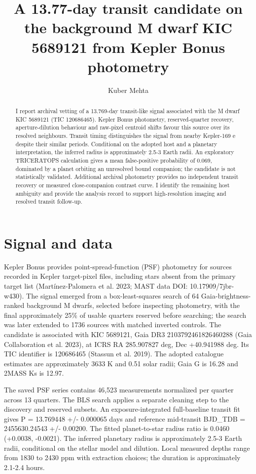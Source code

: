 \documentclass[twocolumn]{aastex7}
\begin{document}
\title{A 13.77-day transit candidate on the background M dwarf KIC 5689121 from Kepler Bonus photometry}
\author[0009-0003-1379-7856]{Kuber Mehta}
\begin{abstract}
I report archival vetting of a 13.769-day transit-like signal associated with the M dwarf KIC 5689121 (TIC 120686465). Kepler Bonus photometry, reserved-quarter recovery, aperture-dilution behaviour and raw-pixel centroid shifts favour this source over its resolved neighbours. Transit timing distinguishes the signal from nearby Kepler-169 e despite their similar periods. Conditional on the adopted host and a planetary interpretation, the inferred radius is approximately 2.5-3 Earth radii. An exploratory TRICERATOPS calculation gives a mean false-positive probability of 0.069, dominated by a planet orbiting an unresolved bound companion; the candidate is not statistically validated. Additional archival photometry provides no independent transit recovery or measured close-companion contrast curve. I identify the remaining host ambiguity and provide the analysis record to support high-resolution imaging and resolved transit follow-up.
\end{abstract}
\section{Signal and data}
Kepler Bonus provides point-spread-function (PSF) photometry for sources recorded in Kepler target-pixel files, including stars absent from the primary target list (Martínez-Palomera et al. 2023; MAST data DOI: 10.17909/7jbr-w430). The signal emerged from a box-least-squares search of 64 Gaia-brightness-ranked background M dwarfs, selected before inspecting photometry, with the final approximately 25\% of usable quarters reserved before searching; the search was later extended to 1736 sources with matched inverted controls. The candidate is associated with KIC 5689121, Gaia DR3 2103792461826460288 (Gaia Collaboration et al. 2023), at ICRS RA 285.907827 deg, Dec +40.941988 deg. Its TIC identifier is 120686465 (Stassun et al. 2019). The adopted catalogue estimates are approximately 3633 K and 0.51 solar radii; Gaia G is 16.28 and 2MASS Ks is 12.97.

The saved PSF series contains 46,523 measurements normalized per quarter across 13 quarters. The BLS search applies a separate cleaning step to the discovery and reserved subsets. An exposure-integrated full-baseline transit fit gives P = 13.769448 +/- 0.000065 days and reference mid-transit BJD\_TDB = 2455630.24543 +/- 0.00200. The fitted planet-to-star radius ratio is 0.0460 (+0.0038, -0.0021). The inferred planetary radius is approximately 2.5-3 Earth radii, conditional on the stellar model and dilution. Local measured depths range from 1830 to 2430 ppm with extraction choices; the duration is approximately 2.1-2.4 hours.
\end{document}
